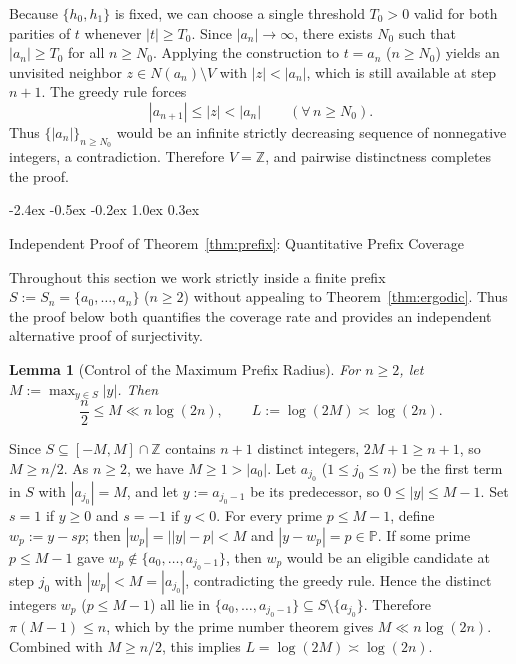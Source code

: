 \documentclass[11pt,a4paper]{article}
\makeatletter
\renewcommand{\section}{\@startsection{section}{1}{\z@}%
  {-2.4ex \@plus -0.5ex \@minus -0.2ex}%
  {1.0ex \@plus 0.3ex}%
  {\Large\bfseries\sffamily\color{ink}\raggedright}}
\theoremstyle{entheorem}
\newtheorem{lemma}{Lemma}[section]
\theoremstyle{enremark}
\renewenvironment{proof}[1][\proofname]{\par
  \pushQED{\qed}%
  \normalfont\topsep5\p@\@plus4\p@\relax
  \trivlist
  \item[\hskip\labelsep\bfseries\sffamily\color{ink}#1\@addpunct{.}]\ignorespaces
}{%
  \popQED\endtrivlist\@endpefalse
}
\newcommand{\Z}{\mathbb{Z}}
\newcommand{\PP}{\mathbb{P}}
\makeatother
\begin{document}
\begin{proof}[Proof of Theorem~\ref{thm:ergodic}]
Because $\{h_0, h_1\}$ is fixed, we can choose a single threshold $T_0 > 0$ valid for both parities of $t$ whenever $|t| \ge T_0$. Since $|a_n| \to \infty$, there exists $N_0$ such that $|a_n| \ge T_0$ for all $n \ge N_0$. Applying the construction to $t = a_n$ ($n \ge N_0$) yields an unvisited neighbor $z \in N(a_n) \setminus V$ with $|z| < |a_n|$, which is still available at step $n + 1$. The greedy rule forces
\[
  |a_{n+1}| \le |z| < |a_n| \qquad (\forall\, n \ge N_0).
\]
Thus $\{|a_n|\}_{n \ge N_0}$ would be an infinite strictly decreasing sequence of nonnegative integers, a contradiction. Therefore $V = \Z$, and pairwise distinctness completes the proof.
\end{proof}

\section{Independent Proof of Theorem~\ref{thm:prefix}: Quantitative Prefix Coverage}

Throughout this section we work strictly inside a finite prefix $S := S_n = \{a_0, \ldots, a_n\}$ ($n \ge 2$) without appealing to Theorem~\ref{thm:ergodic}. Thus the proof below both quantifies the coverage rate and provides an independent alternative proof of surjectivity.

\begin{lemma}[Control of the Maximum Prefix Radius]\label{lem:max-radius}
For $n \ge 2$, let $M := \max_{y \in S} |y|$. Then
\begin{equation}\label{eq:M-bound}
  \frac{n}{2} \le M \ll n\log(2n), \qquad L := \log(2M) \asymp \log(2n).
\end{equation}
\end{lemma}

\begin{proof}
Since $S \subseteq [-M, M] \cap \Z$ contains $n + 1$ distinct integers, $2M + 1 \ge n + 1$, so $M \ge n/2$. As $n \ge 2$, we have $M \ge 1 > |a_0|$. Let $a_{j_0}$ ($1 \le j_0 \le n$) be the first term in $S$ with $|a_{j_0}| = M$, and let $y := a_{j_0-1}$ be its predecessor, so $0 \le |y| \le M - 1$. Set $s = 1$ if $y \ge 0$ and $s = -1$ if $y < 0$. For every prime $p \le M - 1$, define $w_p := y - sp$; then $|w_p| = \bigl||y| - p\bigr| < M$ and $|y - w_p| = p \in \PP$. If some prime $p \le M - 1$ gave $w_p \notin \{a_0, \ldots, a_{j_0-1}\}$, then $w_p$ would be an eligible candidate at step $j_0$ with $|w_p| < M = |a_{j_0}|$, contradicting the greedy rule. Hence the distinct integers $w_p$ ($p \le M - 1$) all lie in $\{a_0, \ldots, a_{j_0-1}\} \subseteq S \setminus \{a_{j_0}\}$. Therefore $\pi(M - 1) \le n$, which by the prime number theorem gives $M \ll n\log(2n)$. Combined with $M \ge n/2$, this implies $L = \log(2M) \asymp \log(2n)$.
\end{proof}
\end{document}
